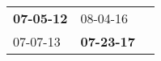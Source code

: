 \begin{supertabular}{p{0.33\columnwidth}p{0.33\columnwidth}p{0.33\columnwidth}}
 \textbf{07-05-12\textsuperscript{}} &           08-04-16\textsuperscript{} \\
          07-07-13\textsuperscript{} &  \textbf{07-23-17\textsuperscript{}} \\
\end{supertabular}
